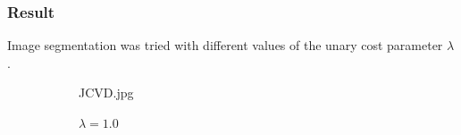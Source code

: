 \documentclass[paper=a4, fontsize=11pt]{scrartcl} %
\numberwithin{equation}{section} %
\numberwithin{figure}{section} %
\numberwithin{table}{section} %
\begin{document}
\subsubsection{Result}

Image segmentation was tried with different values of the unary cost parameter $\lambda$.

\begin{figure}[H]
	\caption{Image segmentation of JCVD.jpg with different $\lambda$\label{fig:simple}}
	\centering
	\begin{subfigure}[b]{0.45\textwidth}
		\noindent{}
	\caption{JCVD.jpg}
	\end{subfigure}
	\begin{subfigure}[b]{0.45\textwidth}
		\noindent{}
	\caption{$\lambda = 1.0$}
	\end{subfigure}
	\begin{subfigure}[b]{0.45\textwidth}
		\noindent{}
\end{subfigure}
\end{figure}
\end{document}

